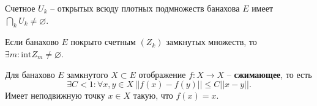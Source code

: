 
\begin{to_thr}
	Счетное ${U_k}$ -- открытых всюду плотных подмножеств банахова $E$ имеет $\bigcap_k U_k \neq \varnothing$.
\end{to_thr}

\begin{to_con}
	Если банахово $E$ покрыто счетным $(Z_k)$ замкнутых множеств, то $\exists m \colon \text{int}Z_m \neq \varnothing$.
\end{to_con}

\begin{to_thr}
	Для банахово $E$ замкнутого $X \subset E$ отображение $f \colon X \to X$ -- \textbf{сжимающее}, то есть
	\begin{equation*}
	 	\exists C <1 \colon \forall x,y \in X \, ||f(x) - f(y)|| \leq C||x-y||.
	 \end{equation*} 
	 Имеет неподвижную точку $x \in X$ такую, что $f(x) = x$.
\end{to_thr}